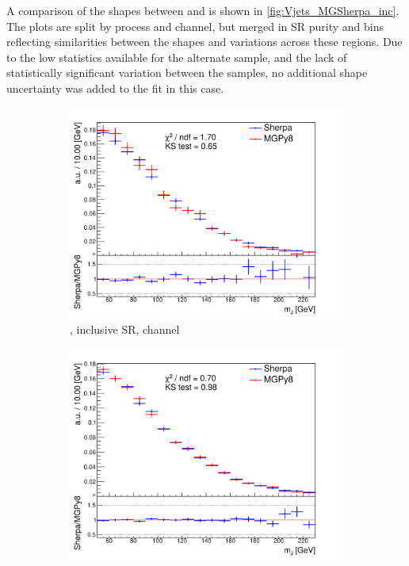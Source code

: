 A comparison of the \mJ shapes between \SHERPA and \MADGRAPH is shown in \cref{fig:Vjets_MGSherpa_inc}.
The plots are split by process and channel, but merged in SR purity and \ptv bins reflecting similarities between the \mJ shapes and variations across these regions.
Due to the low statistics available for the alternate \MADGRAPH sample, and the lack of statistically significant variation between the samples, no additional shape uncertainty was added to the fit in this case. 

\begin{figure}[!htbp]
  \centering
  \begin{subfigure}{.5\textwidth}
    \includegraphics[width=\textwidth]{chapters/6.vhbb_boosted/figs/0L_Whf_2tag1pfat0pjet_ptvinc_SR_noaddbjetsr_mJIncl.pdf}
    \caption{\Whf, \pTV inclusive SR, \zlep channel}
    \label{fig:Vjets_MGSherpa_inc_sub1}
  \end{subfigure}%
  \hfill
  \begin{subfigure}{.5\textwidth}
    \includegraphics[width=\textwidth]{chapters/6.vhbb_boosted/figs/1L_Whf_2tag1pfat0pjet_ptvinc_SR_noaddbjetsr_mJIncl.pdf}

\end{subfigure}
\end{figure}
